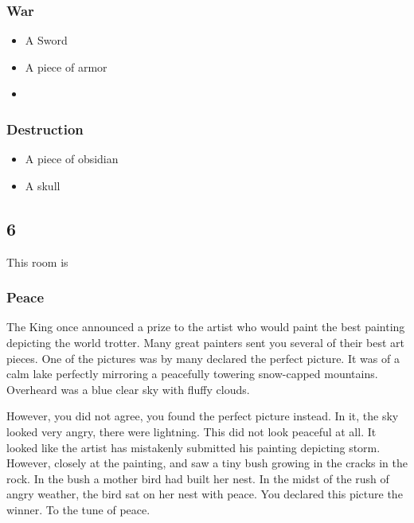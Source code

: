 \subsubsection*{War}
\begin{itemize}
    \item A Sword
    \item A piece of armor
    \item 
\end{itemize}
\subsubsection*{Destruction}
\begin{itemize}
    \item A piece of obsidian
    \item A skull
\end{itemize}


\subsection*{6}
This room is

\subsubsection*{Peace}
The King once announced a prize to the artist who would paint the best painting depicting the world trotter. Many great painters sent you several of their best art pieces. One of the pictures was by many declared the perfect picture. It was of a calm lake perfectly mirroring a peacefully towering snow-capped mountains. Overheard was a blue clear sky with fluffy clouds.

However, you did not agree, you found the perfect picture instead. In it, the sky looked very angry, there were lightning. This did not look peaceful at all. It looked like the artist has mistakenly submitted his painting depicting storm. However,  closely at the painting, and saw a tiny bush growing in the cracks in the rock. In the bush a mother bird had built her nest. In the midst of the rush of angry weather, the bird sat on her nest with peace. You declared this picture the winner. To the tune of peace.


